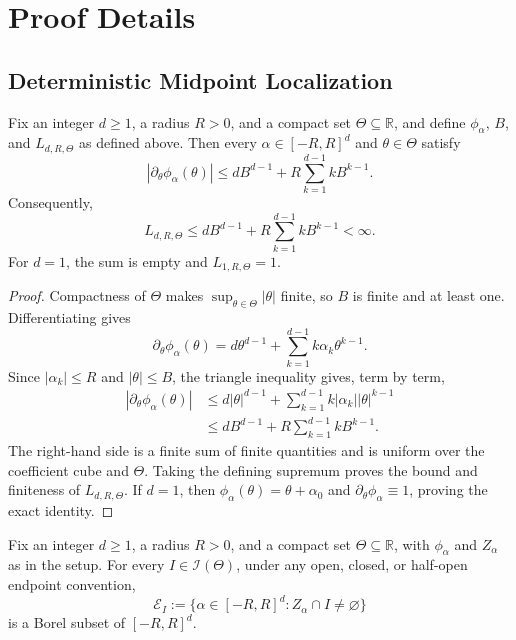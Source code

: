 \appendix

\section{Proof Details}

\subsection{Deterministic Midpoint Localization}
\label{app:midpoint-localization}

\begin{lemma}
\label{lem:derivative-envelope}
Fix an integer $d\geq1$, a radius $R>0$, and a compact set
$\Theta\subseteq\mathbb R$, and define $\phi_\alpha$, $B$, and
$L_{d,R,\Theta}$ as defined above.  Then every
$\alpha\in[-R,R]^d$ and $\theta\in\Theta$ satisfy
\[
\left|\partial_\theta\phi_\alpha(\theta)\right|
\leq dB^{d-1}+R\sum_{k=1}^{d-1}kB^{k-1}.
\]
Consequently,
\[
L_{d,R,\Theta}
\leq dB^{d-1}+R\sum_{k=1}^{d-1}kB^{k-1}<\infty.
\]
For $d=1$, the sum is empty and $L_{1,R,\Theta}=1$.
\end{lemma}

\begin{proof}
Compactness of $\Theta$ makes
$\sup_{\theta\in\Theta}|\theta|$ finite, so $B$ is finite and at least
one.  Differentiating gives
\[
\partial_\theta\phi_\alpha(\theta)
=d\theta^{d-1}+\sum_{k=1}^{d-1}k\alpha_k\theta^{k-1}.
\]
Since $|\alpha_k|\leq R$ and $|\theta|\leq B$, the triangle inequality
gives, term by term,
\[
\begin{aligned}
\left|\partial_\theta\phi_\alpha(\theta)\right|
&\leq d|\theta|^{d-1}
  +\sum_{k=1}^{d-1}k|\alpha_k||\theta|^{k-1}\\
&\leq dB^{d-1}+R\sum_{k=1}^{d-1}kB^{k-1}.
\end{aligned}
\]
The right-hand side is a finite sum of finite quantities and is uniform
over the coefficient cube and $\Theta$.  Taking the defining supremum
proves the bound and finiteness of $L_{d,R,\Theta}$.  If $d=1$, then
$\phi_\alpha(\theta)=\theta+\alpha_0$ and
$\partial_\theta\phi_\alpha\equiv1$, proving the exact identity.
\end{proof}

\begin{proposition}
\label{prop:borel-root-event}
Fix an integer $d\geq1$, a radius $R>0$, and a compact set
$\Theta\subseteq\mathbb R$, with $\phi_\alpha$ and $Z_\alpha$ as in the
setup.  For every $I\in\mathscr I(\Theta)$, under any open, closed, or
half-open endpoint convention,
\[
\mathcal E_I
:=\{\alpha\in[-R,R]^d:Z_\alpha\cap I\neq\varnothing\}
\]
is a Borel subset of $[-R,R]^d$.
\end{proposition}

